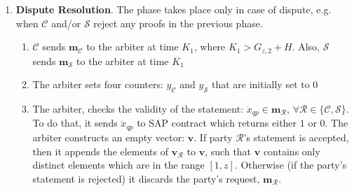 \begin{enumerate}
\begin{enumerate}

\end{enumerate}
\item \textbf{Dispute Resolution}\label{RCSP::Dispute-Resolution}. The phase takes place only in  case of dispute, e.g. when $\mathcal C$ and/or $\mathcal S$ reject any proofs in the previous phase. %

\begin{enumerate}
\item $\mathcal C$  sends $\bm{m}_{\scriptscriptstyle\mathcal C}$ to the arbiter at time $K_{\scriptscriptstyle 1}$, where $K_{\scriptscriptstyle 1}>G_{\scriptscriptstyle z,2}+H$.  Also,  $\mathcal S$ sends $\bm{m}_{\scriptscriptstyle\mathcal S}$ to the arbiter at time $K_{\scriptscriptstyle 1}$ %


\item The arbiter sets four counters: $y_{\scriptscriptstyle\mathcal C}$ and  $y_{\scriptscriptstyle\mathcal S}$ that are initially set to $0$ 

\item\label{arbiter-checks-statement} The arbiter, checks the validity of the statement: $\ddot{x}_{\scriptscriptstyle qp}\in \bm{m}_{\scriptscriptstyle\mathcal R}$,  $\forall \mathcal R\in \{\mathcal {C,S}\}$. To do that, it sends  $\ddot{x}_{\scriptscriptstyle qp}$ to SAP contract which  returns  either $1$ or $0$. The arbiter  constructs an empty vector: $\bm{v}$.  If  party $\mathcal R$'s statement is accepted, then 
 it appends the elements of $\bm{v}_{\scriptscriptstyle\mathcal{R}}$ to $\bm{v}$, such that $\bm{v}$ contains only distinct elements which are in the range $[1,z]$. Otherwise (if the party's statement is rejected) it discards the party's request, $\bm{m}_{\scriptscriptstyle\mathcal{R}}$.


\end{enumerate}
\end{enumerate}
